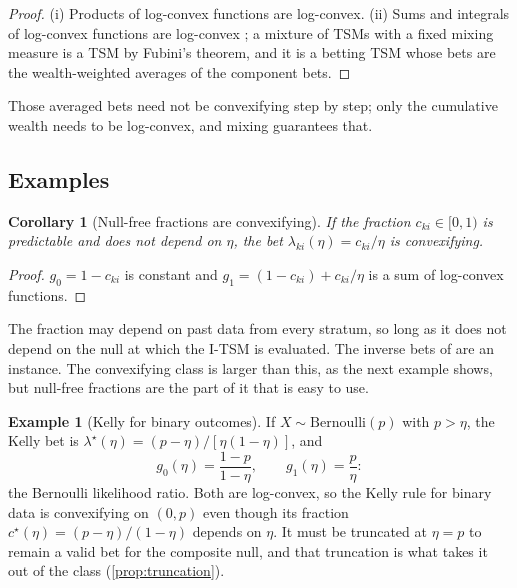 \documentclass[11pt]{article}
\theoremstyle{plain}
\newtheorem{corollary}[theorem]{Corollary}
\theoremstyle{definition}
\newtheorem{example}[theorem]{Example}
\theoremstyle{remark}
\begin{document}
\begin{proof}
(i) Products of log-convex functions are log-convex.  (ii) Sums and integrals of log-convex functions are
log-convex \citep[Section 3.5.2]{boyd2004convex}; a mixture of TSMs with a fixed mixing measure is a TSM by
Fubini's theorem, and it is a betting TSM whose bets are the wealth-weighted averages of the component bets.
\end{proof}

Those averaged bets need not be convexifying step by step; only the cumulative wealth needs to be log-convex, and
mixing guarantees that.

\subsection{Examples}\label{sec:examples}

\begin{corollary}[Null-free fractions are convexifying]\label{cor:nullfree}
If the fraction $c_{ki}\in[0,1)$ is predictable and does not depend on $\eta$, the bet $\lambda_{ki}(\eta)=c_{ki}/\eta$ is
convexifying.
\end{corollary}

\begin{proof}
$g_0 = 1-c_{ki}$ is constant and $g_1 = (1-c_{ki}) + c_{ki}/\eta$ is a sum of log-convex functions.
\end{proof}

The fraction may depend on past data from every stratum, so long as it does not depend on the null at which the I-TSM
is evaluated.  The inverse bets of \citet{spertus2024sequential} are an instance.  The convexifying class is larger
than this, as the next example shows, but null-free fractions are the part of it that is easy to use.

\begin{example}[Kelly for binary outcomes]\label{ex:binary}
If $X\sim\mathrm{Bernoulli}(p)$ with $p>\eta$, the Kelly bet \citep{kelly1956new} is
$\lambda^\star(\eta) = (p-\eta)/[\eta(1-\eta)]$, and
\[
g_0(\eta) = \frac{1-p}{1-\eta}, \qquad g_1(\eta) = \frac{p}{\eta}:
\]
the Bernoulli likelihood ratio.  Both are log-convex, so the Kelly rule for binary data is convexifying on $(0,p)$
even though its fraction $c^\star(\eta) = (p-\eta)/(1-\eta)$ depends on $\eta$.  It must be truncated at $\eta = p$ to remain
a valid bet for the composite null, and that truncation is what takes it out of the class (\cref{prop:truncation}).
\end{example}
\end{document}
